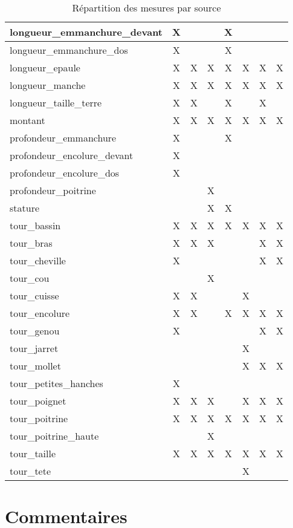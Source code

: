 \documentclass[10pt,a4paper,twoside]{report}
\begin{document}
\begin{table}
\begin{center}
\begin{tabular}{lccccccc}
longueur\_emmanchure\_devant&X&&&X&&&\\ \hline
longueur\_emmanchure\_dos&X&&&X&&&\\ \hline
longueur\_epaule&X&X&X&X&X&X&X\\ \hline
longueur\_manche&X&X&X&X&X&X&X\\ \hline
longueur\_taille\_terre&X&X&&X&&X&\\ \hline
montant&X&X&X&X&X&X&X\\ \hline
profondeur\_emmanchure&X&&&X&&&\\ \hline
profondeur\_encolure\_devant&X&&&&&&\\ \hline
profondeur\_encolure\_dos&X&&&&&&\\ \hline
profondeur\_poitrine&&&X&&&&\\ \hline
stature&&&X&X&&&\\ \hline
tour\_bassin&X&X&X&X&X&X&X\\ \hline
tour\_bras&X&X&X&&&X&X\\ \hline
tour\_cheville&X&&&&&X&X\\ \hline
tour\_cou&&&X&&&&\\ \hline
tour\_cuisse&X&X&&&X&&\\ \hline
tour\_encolure&X&X&&X&X&X&X\\ \hline
tour\_genou&X&&&&&X&X\\ \hline
tour\_jarret&&&&&X&&\\ \hline
tour\_mollet&&&&&X&X&X\\ \hline
tour\_petites\_hanches&X&&&&&&\\ \hline
tour\_poignet&X&X&X&&X&X&X\\ \hline
tour\_poitrine&X&X&X&X&X&X&X\\ \hline
tour\_poitrine\_haute&&&X&&&&\\ \hline
tour\_taille&X&X&X&X&X&X&X\\ \hline
tour\_tete&&&&&X&&\\ \hline
\end{tabular}
\end{center}
\label{tab:meas_det}
\caption{Répartition des mesures par source}
\end{table}










\chapter{Commentaires}
\end{document}
